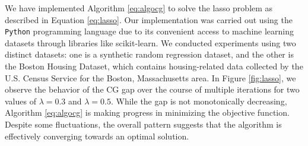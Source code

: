 \documentclass[10pt, twocolumn, reqno, a4paper,oneside]{amsart}
\numberwithin{equation}{section}
\numberwithin{theorem}{section}
\numberwithin{figure}{section}
\numberwithin{table}{section}
\numberwithin{theorem}{section}
\numberwithin{equation}{section}
\begin{document}
We have implemented Algorithm \ref{eq:algocg} to solve the lasso problem as described in Equation \eqref{eq:lasso}. Our implementation was carried out using the {\tt Python} programming language due to its convenient access to machine learning datasets through libraries like scikit-learn. We conducted experiments using two distinct datasets: one is a synthetic random regression dataset, and the other is the Boston Housing Dataset, which contains housing-related data collected by the U.S. Census Service for the Boston, Massachusetts area. In Figure \ref{fig:lasso}, we observe the behavior of the CG gap over the course of multiple iterations for two values of $\lambda = 0.3$ and $\lambda = 0.5$. While the gap is not monotonically decreasing, Algorithm \ref{eq:algocg} is making progress in minimizing the objective function. Despite some fluctuations, the overall pattern suggests that the algorithm is effectively converging towards an optimal solution.
\end{document}
